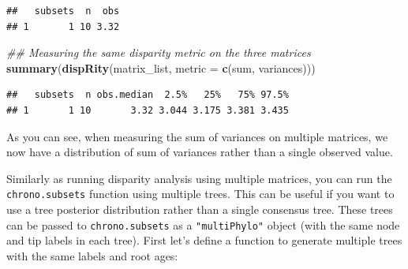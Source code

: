 \documentclass[]{book}
\newenvironment{Shaded}{\begin{snugshade}}{\end{snugshade}}
\newcommand{\CommentTok}[1]{\textcolor[rgb]{0.56,0.35,0.01}{\textit{#1}}}
\newcommand{\DataTypeTok}[1]{\textcolor[rgb]{0.13,0.29,0.53}{#1}}
\newcommand{\KeywordTok}[1]{\textcolor[rgb]{0.13,0.29,0.53}{\textbf{#1}}}
\newcommand{\NormalTok}[1]{#1}
\begin{document}
\begin{verbatim}
##   subsets  n  obs
## 1       1 10 3.32
\end{verbatim}

\begin{Shaded}
\begin{Highlighting}[]
\CommentTok{## Measuring the same disparity metric on the three matrices}
\KeywordTok{summary}\NormalTok{(}\KeywordTok{dispRity}\NormalTok{(matrix_list, }\DataTypeTok{metric =} \KeywordTok{c}\NormalTok{(sum, variances)))}
\end{Highlighting}
\end{Shaded}

\begin{verbatim}
##   subsets  n obs.median  2.5%   25%   75% 97.5%
## 1       1 10       3.32 3.044 3.175 3.381 3.435
\end{verbatim}

As you can see, when measuring the sum of variances on multiple matrices, we now have a distribution of sum of variances rather than a single observed value.

Similarly as running disparity analysis using multiple matrices, you can run the \texttt{chrono.subsets} function using multiple trees.
This can be useful if you want to use a tree posterior distribution rather than a single consensus tree.
These trees can be passed to \texttt{chrono.subsets} as a \texttt{"multiPhylo"} object (with the same node and tip labels in each tree).
First let's define a function to generate multiple trees with the same labels and root ages:
\end{document}

